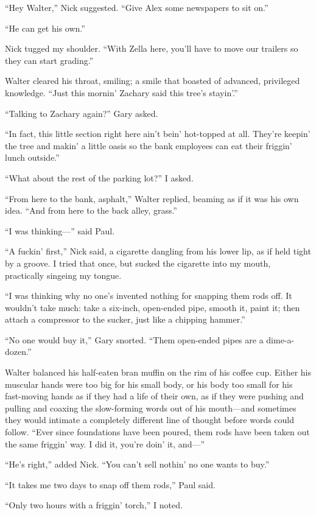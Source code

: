 ``Hey Walter,'' Nick suggested. ``Give Alex some newspapers to sit on.''

``He can get his own.''

Nick tugged my shoulder. ``With Zella here, you'll have to move our
trailers so they can start grading.''

Walter cleared his throat, smiling; a smile that boasted of advanced,
privileged knowledge. ``Just this mornin' Zachary said this tree's
stayin'.''

``Talking to Zachary again?'' Gary asked.

``In fact, this little section right here ain't bein' hot-topped at all.
They're keepin' the tree and makin' a little oasis so the bank employees
can eat their friggin' lunch outside.''

``What about the rest of the parking lot?'' I asked.

``From here to the bank, asphalt,'' Walter replied, beaming as if it was
his own idea. ``And from here to the back alley, grass.''

``I was thinking---'' said Paul.

``A fuckin' first,'' Nick said, a cigarette dangling from his lower lip,
as if held tight by a groove. I tried that once, but sucked the
cigarette into my mouth, practically singeing my tongue.

``I was thinking why no one's invented nothing for snapping them rods
off. It wouldn't take much: take a six-inch, open-ended pipe, smooth it,
paint it; then attach a compressor to the sucker, just like a chipping
hammer.''

``No one would buy it,'' Gary snorted. ``Them open-ended pipes are a
dime-a-dozen.''

Walter balanced his half-eaten bran muffin on the rim of his coffee cup.
Either his muscular hands were too big for his small body, or his body
too small for his fast-moving hands as if they had a life of their own,
as if they were pushing and pulling and coaxing the slow-forming words
out of his mouth---and sometimes they would intimate a completely
different line of thought before words could follow. ``Ever since
foundations have been poured, them rods have been taken out the same
friggin' way. I did it, you're doin' it, and---''

``He's right,'' added Nick. ``You can't sell nothin' no one wants to
buy.''

``It takes me two days to snap off them rods,'' Paul said.

``Only two hours with a friggin' torch,'' I noted.

